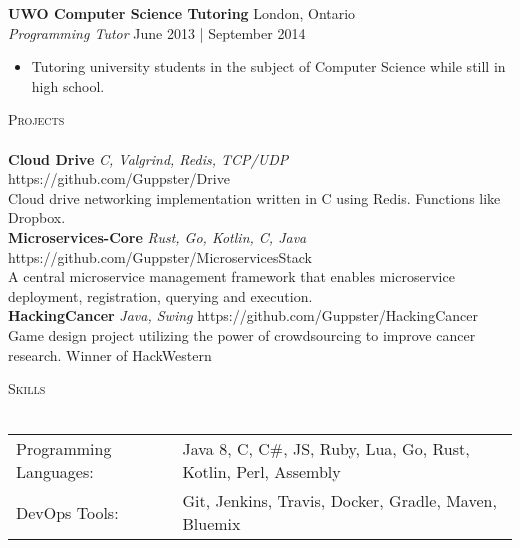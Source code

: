 \documentclass[a4paper]{article}
\newcommand{\lineunder} {
    \vspace*{-8pt} \\
    \hspace*{-18pt} \hrulefill \\
}
\newcommand{\header} [1] {
    {\hspace*{-18pt}\vspace*{6pt} \textsc{#1}}
    \vspace*{-6pt} \lineunder
}
\begin{document}
\textbf{UWO Computer Science Tutoring} \hfill London, Ontario\\
\textit{Programming Tutor} \hfill June 2013 | September 2014\\
\vspace{-1mm}
\begin{itemize} \itemsep 1pt
	\item Tutoring university students in the subject of Computer Science while still in high school.
\end{itemize}

\header{Projects}
{\textbf{Cloud Drive} \sl C, Valgrind, Redis, TCP/UDP} \hfill https://github.com/Guppster/Drive\\
\vspace*{1mm}
Cloud drive networking implementation written in C using Redis. Functions like Dropbox.\\
\vspace*{2mm}
{\textbf{Microservices-Core} \sl Rust, Go, Kotlin, C, Java} \hfill https://github.com/Guppster/MicroservicesStack\\
\vspace*{1mm}
A central microservice management framework that enables microservice deployment, registration, querying and execution.\\
\vspace*{2mm}
{\textbf{HackingCancer} \sl Java, Swing} \hfill https://github.com/Guppster/HackingCancer\\
\vspace*{1mm}
Game design project utilizing the power of crowdsourcing to improve cancer research. Winner of HackWestern\\
\vspace*{2mm}

\header{Skills}
\begin{tabular}{ l l }
	Programming Languages: & Java 8, C, C\#, JS, Ruby, Lua, Go, Rust, Kotlin, Perl, Assembly \\
	DevOps Tools:          & Git, Jenkins, Travis, Docker, Gradle, Maven, Bluemix \\
\end{tabular}

\vspace*{2mm}

\vspace*{2mm}
\end{document}
